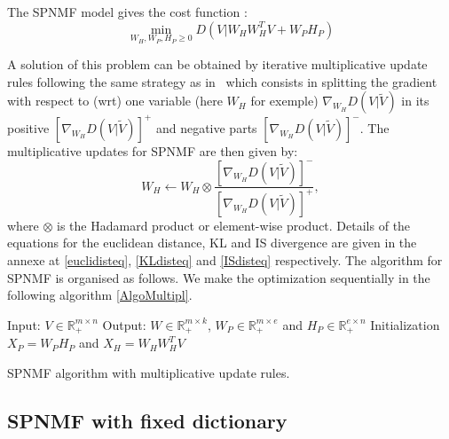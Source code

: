 \documentclass[journal]{IEEEtran}
\begin{document}
The SPNMF model gives the cost function : 
\begin{equation}\label{InitCost}
\min_{W_H,W_P,H_P \geq 0} D(V|W_{H}W_{H}^{T}V + W_{P} H_{P})  
\end{equation}

A solution of this problem can be obtained by iterative multiplicative update rules following the same strategy as in~\cite{yuanOja2005,Lee01algorithmsfor} which consists in splitting the gradient with respect to (wrt) one variable (here $W_H$ for exemple) $\nabla_{W_H} D(V|\tilde{V})$ in its positive $[\nabla_{W_H} D(V|\tilde{V})]^{+}$ and negative parts $[\nabla_{W_H} D(V|\tilde{V})]^{-}$.
The multiplicative updates for SPNMF are then given by: 
$$W_{H} \leftarrow W_{H} \otimes \frac{ [\nabla_{W_H} D(V|\tilde{V})]^{-} }{[\nabla_{W_H} D(V|\tilde{V})]^{+}}, $$
where $\otimes$ is the Hadamard product or element-wise product. Details of the equations for the euclidean distance, KL and IS divergence are given in the annexe at \ref{euclidisteq}, \ref{KLdisteq} and \ref{ISdisteq} respectively. 
The algorithm for SPNMF is organised as follows. We make the optimization sequentially in the following algorithm \ref{AlgoMultipl}.

\begin{algorithm}[h]
 Input: $V \in \mathbb{R}_{+}^{m \times n} $
 Output: $W \in \mathbb{R}_{+}^{m \times k}$, $W_P \in \mathbb{R}_+^{m \times e}$ and $H_P \in \mathbb{R}_{+}^{e \times n}$
 Initialization\;
 $ X_P = W_PH_P $ and
 $ X_H = W_HW_H^TV $ 
  
 \vspace{0.2cm}
 \caption{SPNMF algorithm with multiplicative update rules.}\label{AlgoMultipl}
\end{algorithm}


\subsection{SPNMF with fixed dictionary}\label{fixedict}  
\end{document}
